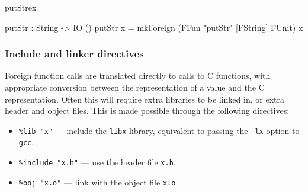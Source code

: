 \begin{SaveVerbatim}{putStrex}

putStr : String -> IO ()
putStr x = mkForeign (FFun "putStr" [FString] FUnit) x
\end{SaveVerbatim}

\subsubsection*{Include and linker directives}

Foreign function calls are translated directly to calls to C functions, with appropriate
conversion between the \Idris{} representation of a value and the C representation.
Often this will require extra libraries to be linked in, or extra header and object files.
This is made possible through the following directives:

\begin{itemize}
\item \texttt{\%lib "x"} --- include the \texttt{libx} library, equivalent to passing the
\texttt{-lx} option to \texttt{gcc}.
\item \texttt{\%include "x.h"} --- use the header file \texttt{x.h}.
\item \texttt{\%obj "x.o"} --- link with the object file \texttt{x.o}.
\end{itemize}


